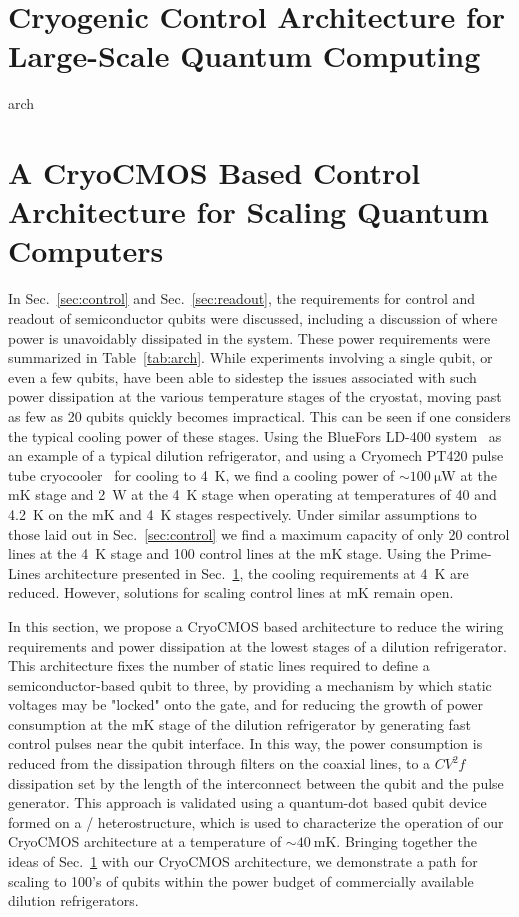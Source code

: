 \clearpage
\section{Cryogenic Control Architecture for Large-Scale Quantum Computing}
\label{sec:primelines}
{arch}

\clearpage
\section{A CryoCMOS Based Control Architecture for Scaling Quantum Computers}
\label{sec:gooseberry}
In Sec.~\ref{sec:control} and Sec.~\ref{sec:readout}, the requirements for control and readout of semiconductor qubits were discussed, including a discussion
of where power is unavoidably dissipated in the system. These power requirements were summarized in Table~\ref{tab:arch}. While experiments involving a single qubit, or even a few qubits, have been able to sidestep the issues associated with such power dissipation at the various temperature stages of the cryostat, moving past as few as 20 qubits quickly becomes impractical. This can be seen if one considers the typical cooling power of these stages. Using the BlueFors LD-400 system~\cite{bluefors}
as an example of a typical dilution refrigerator, and using a Cryomech PT420 pulse tube cryocooler~\cite{cryomech} for cooling
to \SI{4}{\kelvin}, we find a cooling power of $\sim \SI{100}{\micro\watt}$ at the mK stage and \SI{2}{\watt} at the \SI{4}{\kelvin} stage when operating at
temperatures of \SI{40}{\mk} and \SI{4.2}{\kelvin} on the mK and \SI{4}{\kelvin} stages respectively. Under similar assumptions to those laid out in Sec.~\ref{sec:control} we find a maximum capacity of only 20 control lines at the \SI{4}{\kelvin} stage and 100 control lines at the mK stage. Using the Prime-Lines architecture presented in Sec.~\ref{sec:primelines}, the cooling requirements at \SI{4}{\kelvin} are reduced. However, solutions for scaling control lines at mK remain open.

In this section, we propose a CryoCMOS based architecture to reduce the wiring requirements and power dissipation at the lowest stages of a dilution refrigerator. This architecture
fixes the number of static lines required to define a semiconductor-based qubit to three, by providing a mechanism by which static voltages may be "locked" onto the gate, and for
reducing the growth of power consumption at the mK stage of the dilution refrigerator by generating fast control pulses near the qubit interface. In this way, the power
consumption is reduced from the dissipation through filters on the coaxial lines, to a $CV^2f$ dissipation set by the length of the interconnect between the qubit and the pulse
generator. This approach is validated using a quantum-dot based qubit device formed on a / heterostructure, which is used to characterize the operation of
our CryoCMOS architecture at a temperature of $\sim \SI{40}{\milli\kelvin}$. Bringing together the ideas of Sec.~\ref{sec:primelines} with our CryoCMOS architecture, we demonstrate
a path for scaling to 100's of qubits within the power budget of commercially available dilution refrigerators.

